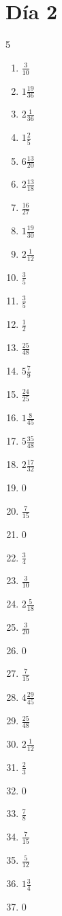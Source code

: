 \documentclass[12pt]{article}
\begin{document}
\section*{Día 2}
\begin{multicols}{5}\begin{enumerate}
\item $ \frac{3}{10} $
\item $ 1 \frac{19}{36} $
\item $ 2 \frac{1}{36} $
\item $ 1 \frac{2}{5} $
\item $ 6 \frac{13}{20} $
\item $ 2 \frac{13}{18} $
\item $ \frac{16}{27} $
\item $ 1 \frac{19}{30} $
\item $ 2 \frac{1}{12} $
\item $ \frac{3}{5} $
\item $ \frac{3}{5} $
\item $ \frac{1}{2} $
\item $ \frac{25}{48} $
\item $ 5 \frac{7}{9} $
\item $ \frac{24}{25} $
\item $ 1 \frac{8}{45} $
\item $ 5 \frac{35}{48} $
\item $ 2 \frac{17}{32} $
\item $ 0 $
\item $ \frac{7}{15} $
\item $ 0 $
\item $ \frac{3}{4} $
\item $ \frac{3}{10} $
\item $ 2 \frac{5}{18} $
\item $ \frac{3}{20} $
\item $ 0 $
\item $ \frac{7}{15} $
\item $ 4 \frac{29}{45} $
\item $ \frac{25}{48} $
\item $ 2 \frac{1}{12} $
\item $ \frac{2}{3} $
\item $ 0 $
\item $ \frac{7}{8} $
\item $ \frac{7}{15} $
\item $ \frac{5}{12} $
\item $ 1 \frac{3}{4} $
\item $ 0 $

\end{enumerate}
\end{multicols}
\end{document}
